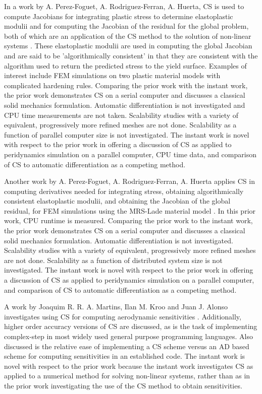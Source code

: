 \documentclass[preprint,12pt]{elsarticle}
\begin{document}
In a work by A. Perez-Foguet, A. Rodriguez-Ferran, A. Huerta, CS is used to
compute Jacobians for integrating plastic stress to determine
elastoplastic modulii and for computing the Jacobian of the residual for the global
problem, both of which are an application of the CS method to the solution of
non-linear systems \cite{perez2000numerical}. These elastoplastic modulii are
used in computing the global Jacobian  and are said to be 'algorithmically
consistent' in that they are consistent with the algorithm used to return the
predicted stress to the yield surface. Examples of interest include FEM
simulations on two plastic material models with complicated hardening rules.
Comparing the prior work with the instant work, the prior work demonstrates CS
on a serial computer and discusses a classical solid mechanics formulation.
Automatic differentiation is not investigated and CPU time measurements are not
taken. Scalability studies with a variety of equivalent, progressively more
refined meshes are not done. Scalability as a function of parallel computer
size is not investigated. The instant work is novel with respect to the prior work in
offering a discussion of CS as applied to peridynamics simulation on a parallel
computer, CPU time data, and comparison of CS to automatic differentiation as a competing method. 

Another work by A. Perez-Foguet, A. Rodriguez-Ferran, A. Huerta applies CS in
computing derivatives needed for integrating stress, obtaining algorithmically
consistent elastoplastic modulii, and obtaining the Jacobian of the global
residual, for FEM simulations using the MRS-Lade material model
\cite{perez2012numerical}. In this prior work, CPU runtime is measured.
Comparing the prior work to the instant work, the prior work demonstrates CS on
a serial computer and discusses a classical solid mechanics formulation.
Automatic differentiation is not investigated.  Scalability studies with a
variety of equivalent, progressively more refined meshes are not done.
Scalability as a function of distributed system size is not investigated.  The
instant work is novel with respect to the prior work in offering a discussion
of CS as applied to peridynamics simulation on a parallel computer, and
comparison of CS to automatic differentiation as a competing method. 

A work by Joaquim R. R. A. Martins, Ilan M. Kroo and Juan J. Alonso
investigates using CS for computing aerodynamic sensitivities
\cite{martins2000automated}. Additionally, higher order accuracy versions of CS
are discussed, as is the task of implementing complex-step in most widely used
general purpose programming languages. Also discussed is the relative ease of
implementing a CS scheme versus an AD based scheme for computing sensitivities
in an established code. The instant work is novel with respect to the prior
work because the instant work investigates CS as applied to a numerical method
for solving non-linear systems, rather than as in the prior work investigating
the use of the CS method to obtain sensitivities.
\end{document}
